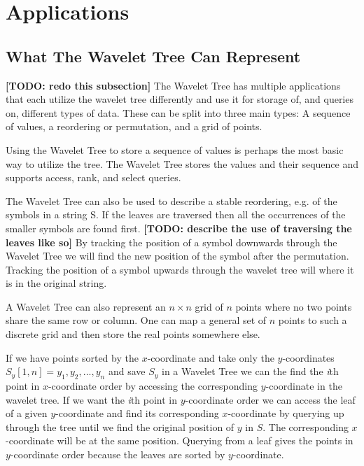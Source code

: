 \section{Applications}
\subsection{What The Wavelet Tree Can Represent}
\textbf{[TODO: redo this subsection]}
The Wavelet Tree has multiple applications that each utilize the wavelet tree differently and use it for storage of, and queries on, different types of data.
These can be split into three main types: A sequence of values, a reordering or permutation, and a grid of points.

Using the Wavelet Tree to store a sequence of values is perhaps the most basic way to utilize the tree.
The Wavelet Tree stores the values and their sequence and supports access, rank, and select queries.

The Wavelet Tree can also be used to describe a stable reordering, e.g. of the symbols in a string S. 
If the leaves are traversed then all the occurrences of the smaller symbols are found first. \textbf{[TODO: describe the use of traversing the leaves like so]}
By tracking the position of a symbol downwards through the Wavelet Tree we will find the new position of the symbol after the permutation.
Tracking the position of a symbol upwards through the wavelet tree will where it is in the original string. 

A Wavelet Tree can also represent an $n \times n$ grid of $n$ points where no two points share the same row or column. 
One can map a general set of $n$ points to such a discrete grid and then store the real points somewhere else.

If we have points sorted by the $x$-coordinate and take only the $y$-coordinates $S_y[1,n] = y_1,y_2,...,y_n$ and save $S_y$ in a Wavelet Tree we can the find the \textit{i}th point in $x$-coordinate order by accessing the corresponding $y$-coordinate in the wavelet tree. 
If we want the \textit{i}th point in $y$-coordinate order we can access the leaf of a given $y$-coordinate and find its corresponding $x$-coordinate by querying up through the tree until we find the original position of $y$ in $S$. 
The corresponding $x$-coordinate will be at the same position.
Querying from a leaf gives the points in $y$-coordinate order because the leaves are sorted by $y$-coordinate.

